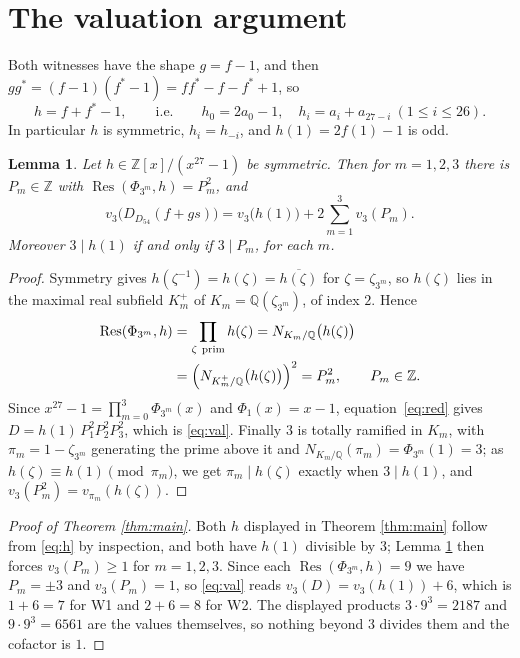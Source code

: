 \documentclass[11pt]{amsart}
\newtheorem{lemma}[theorem]{Lemma}
\theoremstyle{remark}
\DeclareMathOperator{\Res}{Res}
\newcommand{\ZZ}{\mathbb Z}
\begin{document}
\section{The valuation argument}\label{sec:valuation}

Both witnesses have the shape $g=f-1$, and then
$g g^*=(f-1)(f^*-1)=f f^*-f-f^*+1$, so
\begin{equation}\label{eq:h}
 h=f+f^*-1,
 \qquad\text{i.e.}\qquad
 h_0=2a_0-1,\quad h_i=a_i+a_{27-i}\ (1\le i\le26).
\end{equation}
In particular $h$ is symmetric, $h_i=h_{-i}$, and $h(1)=2f(1)-1$ is odd.

\begin{lemma}\label{lem:sq}
Let $h\in\ZZ[x]/(x^{27}-1)$ be symmetric. Then for $m=1,2,3$ there is
$P_m\in\ZZ$ with $\Res(\Phi_{3^m},h)=P_m^2$, and
\begin{equation}\label{eq:val}
 v_3\bigl(D_{D_{54}}(f+gs)\bigr)
 = v_3\bigl(h(1)\bigr)+2\sum_{m=1}^{3}v_3(P_m).
\end{equation}
Moreover $3\mid h(1)$ if and only if $3\mid P_m$, for each $m$.
\end{lemma}

\begin{proof}
Symmetry gives $h(\zeta^{-1})=h(\zeta)=\overline{h(\zeta)}$ for
$\zeta=\zeta_{3^m}$, so $h(\zeta)$ lies in the maximal real subfield
$K_m^+$ of $K_m=\mathbb Q(\zeta_{3^m})$, of index $2$. Hence
\begin{align*}
 \Res(\Phi_{3^m},h)
 &=\prod_{\zeta\ \mathrm{prim}}h(\zeta)
  =N_{K_m/\mathbb Q}\bigl(h(\zeta)\bigr)\\
 &=\Bigl(N_{K_m^+/\mathbb Q}\bigl(h(\zeta)\bigr)\Bigr)^{2}
  =P_m^2,\qquad P_m\in\ZZ .
\end{align*}
Since $x^{27}-1=\prod_{m=0}^{3}\Phi_{3^m}(x)$ and $\Phi_1(x)=x-1$,
equation~\eqref{eq:red} gives
$D=h(1)\,P_1^2P_2^2P_3^2$, which is \eqref{eq:val}.
Finally $3$ is totally ramified in $K_m$, with
$\pi_m=1-\zeta_{3^m}$ generating the prime above it and
$N_{K_m/\mathbb Q}(\pi_m)=\Phi_{3^m}(1)=3$; as
$h(\zeta)\equiv h(1)\pmod{\pi_m}$, we get $\pi_m\mid h(\zeta)$ exactly when
$3\mid h(1)$, and $v_3(P_m^2)=v_{\pi_m}(h(\zeta))$.
\end{proof}

\begin{proof}[Proof of Theorem \ref{thm:main}]
Both $h$ displayed in Theorem \ref{thm:main} follow from \eqref{eq:h} by
inspection, and both have $h(1)$ divisible by $3$; Lemma \ref{lem:sq} then
forces $v_3(P_m)\ge1$ for $m=1,2,3$. Since each $\Res(\Phi_{3^m},h)=9$ we have
$P_m=\pm3$ and $v_3(P_m)=1$, so \eqref{eq:val} reads
$v_3(D)=v_3(h(1))+6$, which is $1+6=7$ for W1 and $2+6=8$ for W2. The
displayed products $3\cdot9^3=2187$ and $9\cdot9^3=6561$ are the values
themselves, so nothing beyond $3$ divides them and the cofactor is $1$.
\end{proof}
\end{document}
